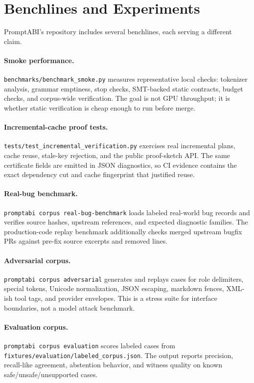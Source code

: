 \documentclass[10pt]{article}
\begin{document}
\newpage
\section{Benchlines and Experiments}

PromptABI's repository includes several benchlines, each serving a different
claim.

\paragraph{Smoke performance.}
\texttt{benchmarks/benchmark\_smoke.py} measures representative local checks:
tokenizer analysis, grammar emptiness, stop checks, SMT-backed static
contracts, budget checks, and corpus-wide verification. The goal is not GPU
throughput; it is whether static verification is cheap enough to run before
merge.

\paragraph{Incremental-cache proof tests.}
\texttt{tests/test\_incremental\_verification.py} exercises real incremental
plans, cache reuse, stale-key rejection, and the public proof-sketch API. The
same certificate fields are emitted in JSON diagnostics, so CI evidence contains
the exact dependency cut and cache fingerprint that justified reuse.

\paragraph{Real-bug benchmark.}
\texttt{promptabi corpus real-bug-benchmark} loads labeled real-world bug
records and verifies source hashes, upstream references, and expected
diagnostic families. The production-code replay benchmark additionally checks
merged upstream bugfix PRs against pre-fix source excerpts and removed lines.

\paragraph{Adversarial corpus.}
\texttt{promptabi corpus adversarial} generates and replays cases for role
delimiters, special tokens, Unicode normalization, JSON escaping, markdown
fences, XML-ish tool tags, and provider envelopes. This is a stress suite for
interface boundaries, not a model attack benchmark.

\paragraph{Evaluation corpus.}
\texttt{promptabi corpus evaluation} scores labeled cases from
\texttt{fixtures/evaluation/labeled\_corpus.json}. The output reports precision,
recall-like agreement, abstention behavior, and witness quality on known
safe/unsafe/unsupported cases.
\end{document}
